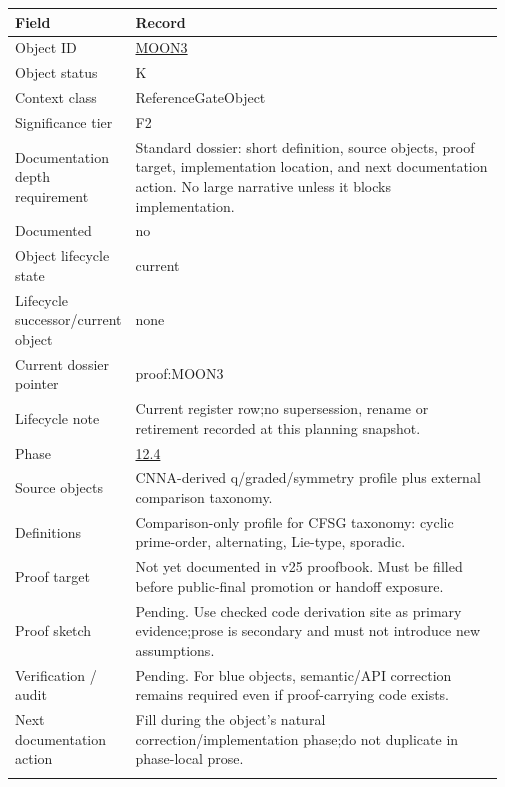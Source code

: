 \begin{longtable}{L{0.16\linewidth} L{0.81\linewidth}}
\hline
\textbf{Field} & \textbf{Record}\\
\hline
Object ID & \hyperlink{object-row-MOON3}{MOON3}\\
\hline\addlinespace[0.20em]
Object status & K\\
\hline\addlinespace[0.20em]
Context class & ReferenceGateObject\\
\hline\addlinespace[0.20em]
Significance tier & F2\\
\hline\addlinespace[0.20em]
Documentation depth requirement & Standard dossier: short definition, source objects, proof target, implementation location, and next documentation action. No large narrative unless it blocks implementation.\\
\hline\addlinespace[0.20em]
Documented & no\\
\hline\addlinespace[0.20em]
Object lifecycle state & current\\
\hline\addlinespace[0.20em]
Lifecycle successor/\allowbreak{}current object & none\\
\hline\addlinespace[0.20em]
Current dossier pointer & proof:MOON3\\
\hline\addlinespace[0.20em]
Lifecycle note & Current register row;\newline no supersession, rename or retirement recorded at this planning snapshot.\\
\hline\addlinespace[0.20em]
Phase & \hyperlink{phase-row-12-4}{12.4}\\
\hline\addlinespace[0.20em]
Source objects & CNNA-derived q/\allowbreak{}graded/\allowbreak{}symmetry profile plus external comparison taxonomy.\\
\hline\addlinespace[0.20em]
Definitions & Comparison-only profile for CFSG taxonomy: cyclic prime-order, alternating, Lie-type, sporadic.\\
\hline\addlinespace[0.20em]
Proof target & Not yet documented in v25 proofbook. Must be filled before public-final promotion or handoff exposure.\\
\hline\addlinespace[0.20em]
Proof sketch & Pending. Use checked code derivation site as primary evidence;\newline prose is secondary and must not introduce new assumptions.\\
\hline\addlinespace[0.20em]
Verification /\allowbreak{} audit & Pending. For blue objects, semantic/\allowbreak{}API correction remains required even if proof-carrying code exists.\\
\hline\addlinespace[0.20em]
Next documentation action & Fill during the object's natural correction/\allowbreak{}implementation phase;\newline do not duplicate in phase-local prose.\\
\hline\addlinespace[0.20em]
\end{longtable}

